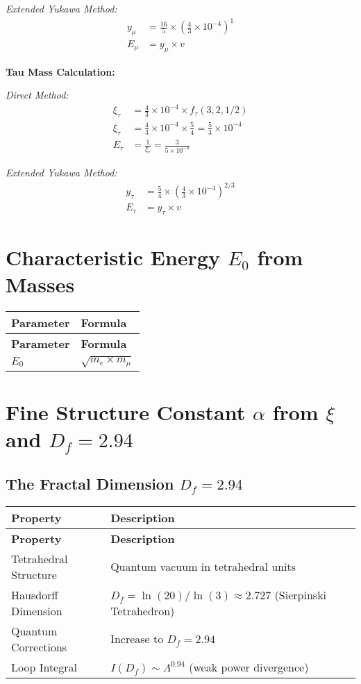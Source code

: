 \documentclass[12pt,a4paper]{article}
\begin{document}
	\textit{Extended Yukawa Method:}
	\begin{align}
		y_\mu &= \frac{16}{5} \times \left(\frac{4}{3} \times 10^{-4}\right)^1 \\
		E_\mu &= y_\mu \times v
	\end{align}
	
	\textbf{Tau Mass Calculation:}
	
	\textit{Direct Method:}
	\begin{align}
		\xi_\tau &= \frac{4}{3} \times 10^{-4} \times f_\tau(3,2,1/2) \\
		\xi_\tau &= \frac{4}{3} \times 10^{-4} \times \frac{5}{4} = \frac{5}{3} \times 10^{-4} \\
		E_{\tau} &= \frac{1}{\xi_\tau} = \frac{3}{5 \times 10^{-4}}
	\end{align}
	
	\textit{Extended Yukawa Method:}
	\begin{align}
		y_\tau &= \frac{5}{4} \times \left(\frac{4}{3} \times 10^{-4}\right)^{2/3} \\
		E_\tau &= y_\tau \times v
	\end{align}
	
	\section{Characteristic Energy \(E_0\) from Masses}
	
	\begin{longtable}{|p{3cm}|p{4cm}|}
		\hline
		\textbf{Parameter} & \textbf{Formula} \\
		\hline
		\endfirsthead
		\hline
		\textbf{Parameter} & \textbf{Formula} \\
		\hline
		\endhead
		\(E_0\) & \(\sqrt{m_e \times m_{\mu}}\) \\
		\hline
	\end{longtable}
	
	
	\section{Fine Structure Constant \(\alpha\) from \(\xi\) and \(D_f = 2.94\)}
	
	\subsection{The Fractal Dimension \(D_f = 2.94\)}
	
	\begin{longtable}{|p{4cm}|p{6cm}|}
		\hline
		\textbf{Property} & \textbf{Description} \\
		\hline
		\endfirsthead
		\hline
		\textbf{Property} & \textbf{Description} \\
		\hline
		\endhead
		Tetrahedral Structure & Quantum vacuum in tetrahedral units \\
		\hline
		Hausdorff Dimension & \(D_f = \ln(20)/\ln(3) \approx 2.727\) (Sierpinski Tetrahedron) \\
		\hline
		Quantum Corrections & Increase to \(D_f = 2.94\) \\
		\hline
		Loop Integral & \(I(D_f) \sim \Lambda^{0.94}\) (weak power divergence) \\
		\hline
	\end{longtable}
	
\end{document}
